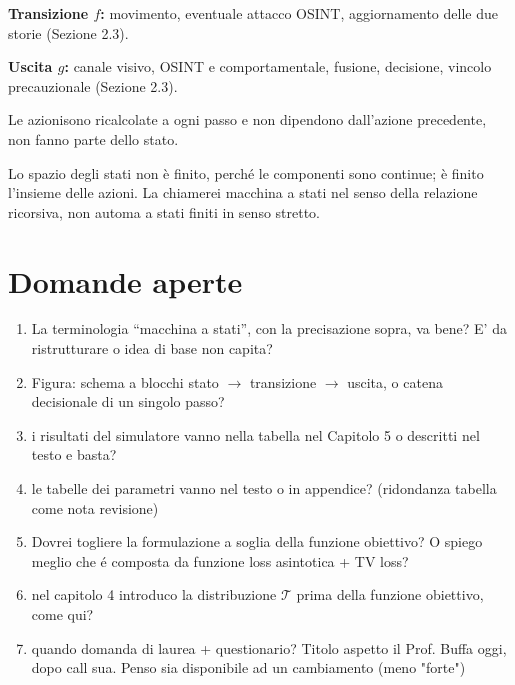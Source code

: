 \documentclass[a4paper, 11pt]{article}
\begin{document}
\textbf{Transizione $f$:} movimento, eventuale attacco OSINT, aggiornamento
delle due storie (Sezione 2.3).

\textbf{Uscita $g$:} canale visivo, OSINT e comportamentale, fusione,
decisione, vincolo precauzionale (Sezione 2.3).

Le azionisono ricalcolate a ogni passo
e non dipendono dall'azione precedente, non fanno parte dello stato.

Lo spazio degli stati non è finito, perché le
componenti sono continue; è finito l'insieme delle azioni. La chiamerei
macchina a stati nel senso della relazione ricorsiva, non automa a stati
finiti in senso stretto.

\section{Domande aperte}

\begin{enumerate}
\item La terminologia ``macchina a stati'', con la precisazione sopra, va
bene? E' da ristrutturare o idea di base non capita?
\item Figura: schema a blocchi stato $\to$ transizione $\to$ uscita, o
catena decisionale di un singolo passo?
\item i risultati del simulatore vanno nella tabella nel Capitolo 5 o descritti nel testo e basta? 
\item le tabelle dei parametri vanno nel testo o in appendice? (ridondanza tabella come nota revisione)
\item Dovrei togliere la formulazione a soglia della funzione obiettivo? O spiego meglio che é composta da funzione loss asintotica + TV loss?
\item nel capitolo 4 introduco la distribuzione $\mathcal{T}$ prima della
funzione obiettivo, come qui?
\item quando domanda di laurea + questionario? Titolo aspetto il Prof. Buffa oggi, dopo call sua. Penso sia disponibile ad un cambiamento (meno "forte")

\end{enumerate}
\end{document}

